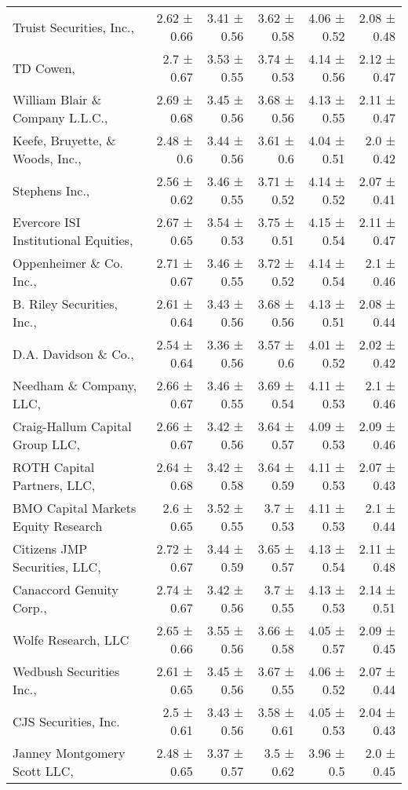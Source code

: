 \begin{tabular}{lrrrrr}
Truist Securities, Inc.,  & 2.62 ± 0.66 & 3.41 ± 0.56 & 3.62 ± 0.58 & 4.06 ± 0.52 & 2.08 ± 0.48 \\
TD Cowen,  & 2.7 ± 0.67 & 3.53 ± 0.55 & 3.74 ± 0.53 & 4.14 ± 0.56 & 2.12 ± 0.47 \\
William Blair \& Company L.L.C.,  & 2.69 ± 0.68 & 3.45 ± 0.56 & 3.68 ± 0.56 & 4.13 ± 0.55 & 2.11 ± 0.47 \\
Keefe, Bruyette, \& Woods, Inc.,  & 2.48 ± 0.6 & 3.44 ± 0.56 & 3.61 ± 0.6 & 4.04 ± 0.51 & 2.0 ± 0.42 \\
Stephens Inc.,  & 2.56 ± 0.62 & 3.46 ± 0.55 & 3.71 ± 0.52 & 4.14 ± 0.52 & 2.07 ± 0.41 \\
Evercore ISI Institutional Equities,  & 2.67 ± 0.65 & 3.54 ± 0.53 & 3.75 ± 0.51 & 4.15 ± 0.54 & 2.11 ± 0.47 \\
Oppenheimer \& Co. Inc.,  & 2.71 ± 0.67 & 3.46 ± 0.55 & 3.72 ± 0.52 & 4.14 ± 0.54 & 2.1 ± 0.46 \\
B. Riley Securities, Inc.,  & 2.61 ± 0.64 & 3.43 ± 0.56 & 3.68 ± 0.56 & 4.13 ± 0.51 & 2.08 ± 0.44 \\
D.A. Davidson \& Co.,  & 2.54 ± 0.64 & 3.36 ± 0.56 & 3.57 ± 0.6 & 4.01 ± 0.52 & 2.02 ± 0.42 \\
Needham \& Company, LLC,  & 2.66 ± 0.67 & 3.46 ± 0.55 & 3.69 ± 0.54 & 4.11 ± 0.53 & 2.1 ± 0.46 \\
Craig-Hallum Capital Group LLC,  & 2.66 ± 0.67 & 3.42 ± 0.56 & 3.64 ± 0.57 & 4.09 ± 0.53 & 2.09 ± 0.46 \\
ROTH Capital Partners, LLC,  & 2.64 ± 0.68 & 3.42 ± 0.58 & 3.64 ± 0.59 & 4.11 ± 0.53 & 2.07 ± 0.43 \\
BMO Capital Markets Equity Research & 2.6 ± 0.65 & 3.52 ± 0.55 & 3.7 ± 0.53 & 4.11 ± 0.53 & 2.1 ± 0.44 \\
Citizens JMP Securities, LLC,  & 2.72 ± 0.67 & 3.44 ± 0.59 & 3.65 ± 0.57 & 4.13 ± 0.54 & 2.11 ± 0.48 \\
Canaccord Genuity Corp.,  & 2.74 ± 0.67 & 3.42 ± 0.56 & 3.7 ± 0.55 & 4.13 ± 0.53 & 2.14 ± 0.51 \\
Wolfe Research, LLC & 2.65 ± 0.66 & 3.55 ± 0.56 & 3.66 ± 0.58 & 4.05 ± 0.57 & 2.09 ± 0.45 \\
Wedbush Securities Inc.,  & 2.61 ± 0.65 & 3.45 ± 0.56 & 3.67 ± 0.55 & 4.06 ± 0.52 & 2.07 ± 0.44 \\
CJS Securities, Inc. & 2.5 ± 0.61 & 3.43 ± 0.56 & 3.58 ± 0.61 & 4.05 ± 0.53 & 2.04 ± 0.43 \\
Janney Montgomery Scott LLC,  & 2.48 ± 0.65 & 3.37 ± 0.57 & 3.5 ± 0.62 & 3.96 ± 0.5 & 2.0 ± 0.45 \\

\end{tabular}

